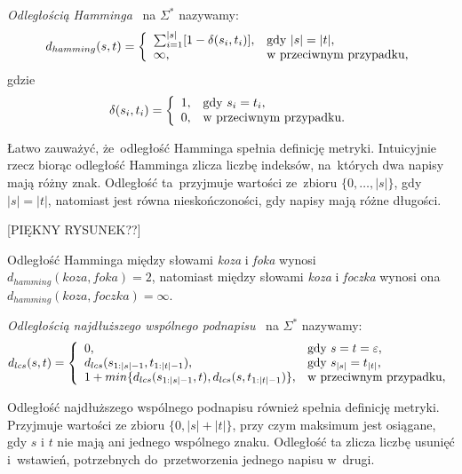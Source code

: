 \documentclass{praca1}
\begin{document}
\begin{definition}
\emph{Odległością Hamminga}~\cite{Hamming1950:errordetecting} na $\Sigma^*$ nazywamy:
$$
d_{hamming}(s, t) = \left\{
\begin{array}{l l}     
    \sum_{i=1}^{|s|}[1 - \delta(s_i, t_i)], & \text{gdy } |s| = |t|,\\
    \infty, & \text{w przeciwnym przypadku},
\end{array}\right.
$$
gdzie 
$$
\delta(s_i, t_i) = \left\{
\begin{array}{l l}     
    1, & \text{gdy } s_i = t_i,\\
    0, & \text{w przeciwnym przypadku}.
\end{array}\right.
$$
\end{definition}

Łatwo zauważyć, że~odległość Hamminga spełnia definicję metryki. Intuicyjnie rzecz biorąc odległość Hamminga zlicza liczbę indeksów, na~których dwa napisy mają różny znak. Odległość ta~przyjmuje wartości ze~zbioru $\{0,\ldots,|s|\}$, gdy $|s|=|t|$, natomiast jest równa nieskończoności, gdy napisy mają różne długości.

[PIĘKNY RYSUNEK??]

\begin{example}
Odległość Hamminga między słowami \emph{koza} i \emph{foka} wynosi $d_{hamming}(koza, foka) = 2$, natomiast między słowami \emph{koza} i \emph{foczka} wynosi ona $d_{hamming}(koza, foczka) = \infty$.
\end{example}

\begin{definition}
\emph{Odległością najdłuższego wspólnego podnapisu}~\cite{Needleman2008:generalmethod} na $\Sigma^*$ nazywamy:
$$
d_{lcs}(s, t) = \left\{
\begin{array}{l l}     
    0, & \text{gdy } s = t = \varepsilon,\\
    d_{lcs}(s_{1:|s|-1}, t_{1:|t|-1}), & \text{gdy } s_{|s|} = t_{|t|}, \\
    1+min\{d_{lcs}(s_{1:|s|-1}, t), d_{lcs}(s, t_{1:|t|-1})\}, & \text{w przeciwnym przypadku},
\end{array}\right.
$$
\end{definition}

Odległość najdłuższego wspólnego podnapisu również spełnia definicję metryki. Przyjmuje wartości ze zbioru $\{0, |s|+|t|\}$, przy czym maksimum jest osiągane, gdy $s$ i $t$ nie mają ani jednego wspólnego znaku.
Odległość ta zlicza liczbę usunięć i~wstawień, potrzebnych do~przetworzenia jednego napisu w~drugi. 
\end{document}

